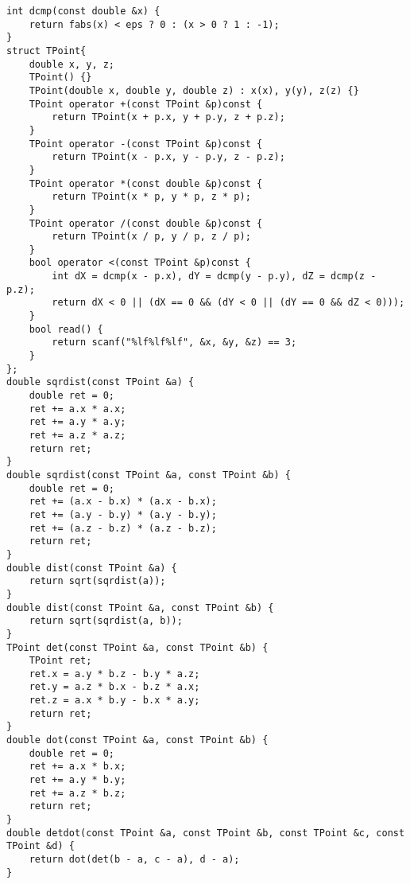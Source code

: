 \begin{lstlisting}
int dcmp(const double &x) {
	return fabs(x) < eps ? 0 : (x > 0 ? 1 : -1);
}
struct TPoint{
	double x, y, z;
	TPoint() {}
	TPoint(double x, double y, double z) : x(x), y(y), z(z) {}
	TPoint operator +(const TPoint &p)const {
		return TPoint(x + p.x, y + p.y, z + p.z);
	}
	TPoint operator -(const TPoint &p)const {
		return TPoint(x - p.x, y - p.y, z - p.z);
	}
	TPoint operator *(const double &p)const {
		return TPoint(x * p, y * p, z * p);
	}
	TPoint operator /(const double &p)const {
		return TPoint(x / p, y / p, z / p);
	}
	bool operator <(const TPoint &p)const {
		int dX = dcmp(x - p.x), dY = dcmp(y - p.y), dZ = dcmp(z - p.z);
		return dX < 0 || (dX == 0 && (dY < 0 || (dY == 0 && dZ < 0)));
	}
	bool read() {
		return scanf("%lf%lf%lf", &x, &y, &z) == 3;
	}
};
double sqrdist(const TPoint &a) {
	double ret = 0;
	ret += a.x * a.x;
	ret += a.y * a.y;
	ret += a.z * a.z;
	return ret;
}
double sqrdist(const TPoint &a, const TPoint &b) {
	double ret = 0;
	ret += (a.x - b.x) * (a.x - b.x);
	ret += (a.y - b.y) * (a.y - b.y);
	ret += (a.z - b.z) * (a.z - b.z);
	return ret;
}
double dist(const TPoint &a) {
	return sqrt(sqrdist(a));
}
double dist(const TPoint &a, const TPoint &b) {
	return sqrt(sqrdist(a, b));
}
TPoint det(const TPoint &a, const TPoint &b) {
	TPoint ret;
	ret.x = a.y * b.z - b.y * a.z;
	ret.y = a.z * b.x - b.z * a.x;
	ret.z = a.x * b.y - b.x * a.y;
	return ret;
}
double dot(const TPoint &a, const TPoint &b) {
	double ret = 0;
	ret += a.x * b.x;
	ret += a.y * b.y;
	ret += a.z * b.z;
	return ret;
}
double detdot(const TPoint &a, const TPoint &b, const TPoint &c, const TPoint &d) {
	return dot(det(b - a, c - a), d - a);
}
\end{lstlisting}
